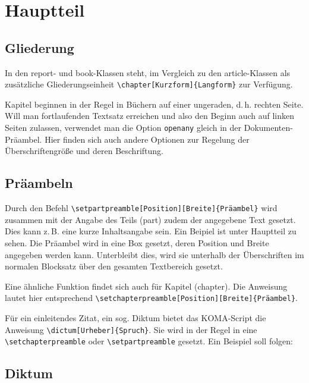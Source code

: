 \documentclass[a4paper,
openany,							%
toc=chapterentrywithdots
]
{scrbook}
\begin{document}
\mainmatter						%
\part[]{Hauptteil}
\chapter{Gliederung}

In den report- und book-Klassen steht, im Vergleich zu den article-Klassen als zusätzliche Gliederungseinheit \verb#\chapter[Kurzform]{Langform}# zur Verfügung. 

Kapitel beginnen in der Regel in Büchern auf einer ungeraden, d.\,h. rechten Seite. Will man fortlaufenden Textsatz erreichen und also den Beginn auch auf linken Seiten zulassen, verwendet man die Option \verb#openany# gleich in der Dokumenten-Präambel. Hier finden sich auch andere Optionen zur Regelung der Überschriftengröße und deren Beschriftung.


\chapter{Präambeln}

Durch den Befehl \verb#\setpartpreamble[Position][Breite]{Präambel}# wird zusammen mit der Angabe des Teils (part) zudem der angegebene Text gesetzt. Dies kann z.\,B. eine kurze Inhaltsangabe sein. Ein Beipiel ist unter Hauptteil zu sehen.  Die Präambel wird in eine Box gesetzt, deren Position und Breite angegeben werden kann. Unterbleibt dies, wird sie unterhalb der Überschriften im normalen Blocksatz über den gesamten Textbereich gesetzt.

Eine ähnliche Funktion findet sich auch für Kapitel (chapter). Die Anweisung lautet hier entsprechend \verb#\setchapterpreamble[Position][Breite]{Präambel}#. 

Für ein einleitendes Zitat, ein sog. Diktum bietet das KOMA-Script die Anweisung \verb#\dictum[Urheber]{Spruch}#. Sie wird in der Regel in eine \verb#\setchapterpreamble# oder \verb#\setpartpreamble# gesetzt. Ein Beispiel soll folgen:

\chapter{Diktum}
\end{document}
